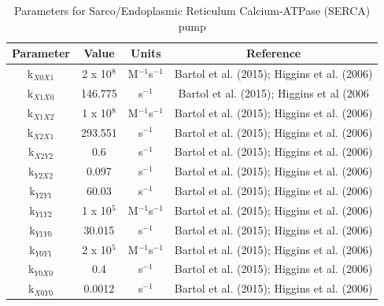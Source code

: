 \documentclass[12pt]{ucsddissertation}
\begin{document}
\begin{table}[h]
\centering
\caption{Parameters for Sarco/Endoplasmic Reticulum 
Calcium-ATPase (SERCA) pump}
\begin{tabular}{cccc}
\hline
\textbf{Parameter} & \textbf{Value} & \textbf{Units} & \textbf{
Reference} \\
\hline
k$_{X0X1}$ & 2 x 10$^{8}$ & M$^{-1}$s$^{-1}$ & Bartol et 
al. (2015); Higgins et al. (2006) \\
\hline
k$_{X1X0}$ & 146.775 & s$^{-1}$ & Bartol et al. (2015); Higgins 
et al (2006\\
\hline
k$_{X1X2}$ & 1 x 10$^{8}$ & M$^{-1}$s$^{-1}$ & Bartol et 
al. (2015); Higgins et al. (2006) \\
\hline
k$_{X2X1}$ & 293.551 & s$^{-1}$ & Bartol et al. (2015); Higgins 
et al. (2006) \\
\hline
k$_{X2Y2}$ & 0.6 & s$^{-1}$ & Bartol et al. (2015); Higgins et al. 
(2006) \\
\hline
k$_{Y2X2}$ & 0.097 & s$^{-1}$ & Bartol et al. (2015); Higgins et 
al. (2006) \\
\hline
k$_{Y2Y1}$ & 60.03 & s$^{-1}$ & Bartol et al. (2015); Higgins et 
al. (2006) \\
\hline
k$_{Y1Y2}$ & 1 x 10$^{5}$ & M$^{-1}$s$^{-1}$ & Bartol et 
al. (2015); Higgins et al. (2006) \\
\hline
k$_{Y1Y0}$ & 30.015 & s$^{-1}$ & Bartol et al. (2015); Higgins et 
al. (2006) \\
\hline
k$_{Y0Y1}$ & 2 x 10$^{5}$ & M$^{-1}$s$^{-1}$ & Bartol et 
al. (2015); Higgins et al. (2006) \\
\hline
k$_{Y0X0}$ & 0.4 & s$^{-1}$ & Bartol et al. (2015); Higgins et al. 
(2006) \\
\hline
k$_{X0Y0}$ & 0.0012 & s$^{-1}$ & Bartol et al. (2015); Higgins et 
al. (2006) \\
\hline
\end{tabular}
\end{table}

\end{document}
